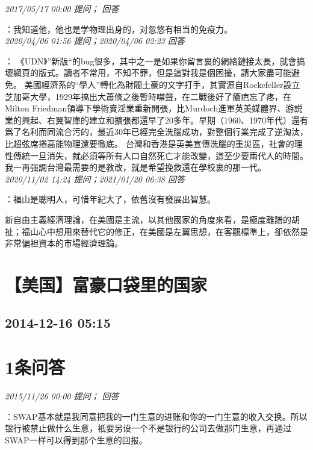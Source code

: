 \documentclass[twocolumn]{ctexart}
\begin{document}
\textit{\hfill\noindent\small 2017/05/17 00:00 提问； 回答}

：我知道他，他也是学物理出身的，对忽悠有相当的免疫力。\\

\textit{\hfill\noindent\small 2020/04/06 01:56 提问；2020/04/06 02:23 回答}

：
《UDN》”新版“的bug很多，其中之一是如果你留言裏的網絡鏈接太長，就會搞壞網頁的版式。讀者不常用，不知不罪，但是這對我是個困擾，請大家盡可能避免。 
美國經濟系的“學人”轉化為財閥土豪的文字打手，其實源自Rockefeller設立芝加哥大學，1929年搞出大蕭條之後暫時噤聲，在二戰後好了瘡疤忘了疼，在Milton Friedman領導下學術賣淫業重新開張，比Murdoch進軍英美媒體界、游説業的興起、右翼智庫的建立和擴張都還早了20多年。早期（1960、1970年代）還有爲了名利而同流合污的，最近30年已經完全洗腦成功，對整個行業完成了逆淘汰，比超弦席捲高能物理還要徹底。 
台灣和香港是英美宣傳洗腦的重災區，社會的理性傳統一旦消失，就必須等所有人口自然死亡才能改變，這至少要兩代人的時間。我一再强調台灣最需要的是教改，就是希望挽救還在學校裏的那一代。
\\

\textit{\hfill\noindent\small 2020/11/02 14:24 提问；2021/01/20 06:38 回答}

：福山是聰明人，可惜年紀大了，依舊沒有發展出智慧。

新自由主義經濟理論，在美國是主流，以其他國家的角度來看，是極度離譜的胡扯；福山心中想用來替代它的修正，在美國是左翼思想，在客觀標準上，卻依然是非常偏袒資本的市場經濟理論。
\\


\section{【美国】富豪口袋里的国家}
\subsection{2014-12-16 05:15}


\section{1条问答}

\textit{\hfill\noindent\small 2015/11/26 00:00 提问； 回答}

：SWAP基本就是我同意把我的一门生意的进账和你的一门生意的收入交换。所以银行被禁止做什么生意，衹要另设一个不是银行的公司去做那门生意，再通过SWAP一样可以得到那个生意的回报。\\
\end{document}
